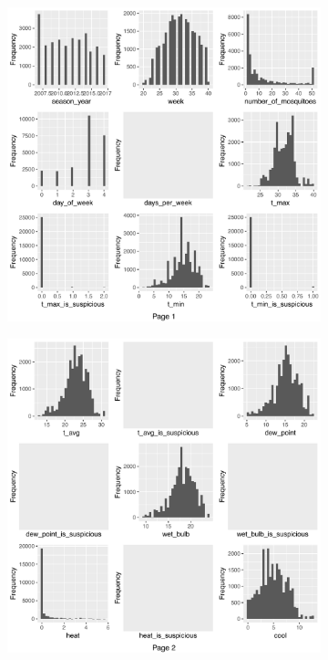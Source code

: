 \begin{figure}[htb]
	\centering
	\begin{subfigure}[t]{0.49\textwidth}
		\includegraphics[width=\textwidth]{images/ml/plot_histogram1}
	\end{subfigure}
	\begin{subfigure}[t]{0.49\textwidth}
		\includegraphics[width=\textwidth]{images/ml/plot_histogram2}

\end{subfigure}
\end{figure}
